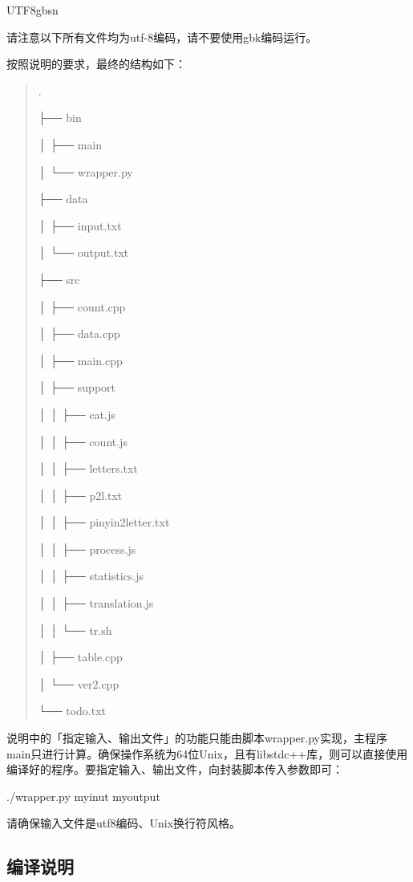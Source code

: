 \documentclass{article}
\newenvironment{tmindent}{\begin{tmparmod}{1.5em}{0pt}{0pt}}{\end{tmparmod}}
\newenvironment{tmparmod}[3]{\begin{list}{}{\setlength{\topsep}{0pt}\setlength{\leftmargin}{#1}\setlength{\rightmargin}{#2}\setlength{\parindent}{#3}\setlength{\listparindent}{\parindent}\setlength{\itemindent}{\parindent}\setlength{\parsep}{\parskip}} \item[]}{\end{list}}
\begin{document}
\begin{CJK*}{UTF8}{gbsn}
\begin{tmindent}
  请注意以下所有文件均为utf-8编码，请不要使用gbk编码运行。
  
  按照说明的要求，最终的结构如下：
  
  \begin{quotation}
    .
    
    ├── bin
    
    │ ├── main
    
    │ └── wrapper.py
    
    ├── data
    
    │ ├── input.txt
    
    │ └── output.txt
    
    ├── src
    
    │ ├── count.cpp
    
    │ ├── data.cpp
    
    │ ├── main.cpp
    
    │ ├── support
    
    │ │ ├── cat.js
    
    │ │ ├── count.js
    
    │ │ ├── letters.txt
    
    │ │ ├── p2l.txt
    
    │ │ ├── pinyin2letter.txt
    
    │ │ ├── process.js
    
    │ │ ├── statistics.js
    
    │ │ ├── translation.js
    
    │ │ └── tr.sh
    
    │ ├── table.cpp
    
    │ └── ver2.cpp
    
    └── todo.txt
  \end{quotation}
  
  说明中的「指定输入、输出文件」的功能只能由脚本wrapper.py实现，主程序main只进行计算。确保操作系统为64位Unix，且有libstdc++库，则可以直接使用编译好的程序。要指定输入、输出文件，向封装脚本传入参数即可：
  \begin{tmindent}
    ./wrapper.py myinut myoutput
  \end{tmindent}
  请确保输入文件是utf8编码、Unix换行符风格。
\end{tmindent}

\subsection{编译说明}

\begin{tmindent}
  \
  

\end{tmindent}
\end{CJK*}
\end{document}
